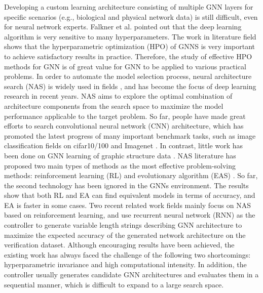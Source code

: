 \documentclass[lettersize,journal]{IEEEtran}
\begin{document}
Developing a custom learning architecture consisting of multiple GNN layers for specific scenarios (e.g., biological and physical network data) is still difficult, even for neural network experts. Falkner et al. \cite{20} pointed out that the deep learning algorithm is very sensitive to many hyperparameters. The work in literature field \cite{21} shows that the hyperparametric optimization (HPO) of GNNS is very important to achieve satisfactory results in practice. Therefore, the study of effective HPO methods for GNN is of great value for GNN to be applied to various practical problems. In order to automate the model selection process, neural architecture search (NAS) is widely used in fields \cite{22,23}, and has become the focus of deep learning research in recent years. NAS aims to explore the optimal combination of architecture components from the search space to maximize the model performance applicable to the target problem. So far, people have made great efforts to search convolutional neural network (CNN) architecture, which has promoted the latest progress of many important benchmark tasks, such as image classification fields on cifar10/100 and Imagenet \cite{24, 25}. In contrast, little work has been done on GNN learning of graphic structure data \cite{26,27,28}. NAS literature has proposed two main types of methods as the most effective problem-solving methods: reinforcement learning (RL) and evolutionary algorithm (EAS) \cite{28}. So far, the second technology has been ignored in the GNNs environment. The results show that both RL and EA can find equivalent models in terms of accuracy, and EA is faster in some cases. Two recent related work fields \cite{28,30} mainly focus on NAS based on reinforcement learning, and use recurrent neural network (RNN) as the controller to generate variable length strings describing GNN architecture to maximize the expected accuracy of the generated network architecture on the verification dataset. Although encouraging results have been achieved, the existing work has always faced the challenge of the following two shortcomings: hyperparametric invariance and high computational intensity. In addition, the controller usually generates candidate GNN architectures and evaluates them in a sequential manner, which is difficult to expand to a large search space.
\end{document}
